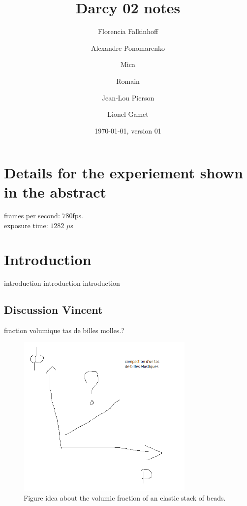 \documentclass[twocolumn,amsmath,amssymb,floatfix]{article}
\begin{document}
\title{Darcy 02 notes}
\author{Florencia Falkinhoff}

\author{Alexandre Ponomarenko}
\author{Mica}
\author{Romain}

\author{Jean-Lou Pierson}
\author{Lionel Gamet}
\date{\today, version 01}

\begin{abstract}
\end{abstract}

\maketitle

\section{Details for the experiement shown in the abstract}

frames per second: $780$fps.\\
exposure time: $1282$  $\mu$s\\


\section{Introduction}
introduction introduction introduction

\subsection{Discussion Vincent}

fraction volumique tas de billes molles.?

\begin{figure}
\includegraphics[height=8cm]{figures/elasticBeadsStack_VolumicFraction.png}
\caption{Figure idea about the volumic fraction of an elastic stack of beads.}
\label{fig:volFrac_elasticStac}
\end{figure}
\end{document}
